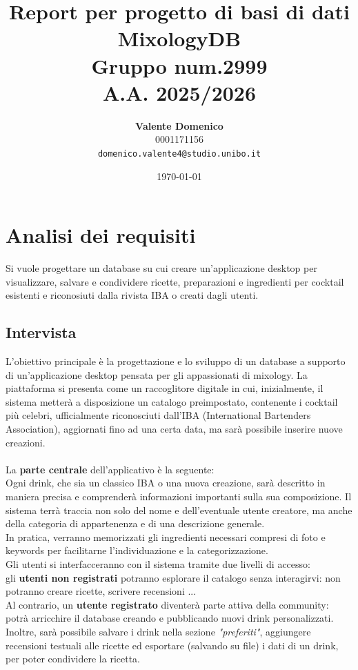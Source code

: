 \documentclass[a4paper,12pt]{report}
\title{Report per progetto di basi di dati\\ MixologyDB\\ \small Gruppo num.\normalsize 2999\\ \large A.A. 2025/2026\\}
\author{
    \textbf{\vspace{0.1cm}Valente Domenico} \\
     0001171156 \\
    \texttt{domenico.valente4@studio.unibo.it}
}
\date{\today}
\begin{document}
\maketitle

\tableofcontents
\newpage

\section{Analisi dei requisiti}
\begin{flushleft}
Si vuole progettare un database su cui creare un'applicazione desktop per visualizzare, salvare e condividere ricette, preparazioni e ingredienti per cocktail esistenti e riconosiuti dalla rivista IBA o creati dagli utenti.
\end{flushleft}

\subsection{Intervista}
L'obiettivo principale è la progettazione e lo sviluppo di un database a supporto di un'applicazione desktop pensata per gli appassionati di mixology. La piattaforma si presenta come un raccoglitore digitale in cui, inizialmente, il sistema metterà a disposizione un catalogo preimpostato, contenente i cocktail più celebri, ufficialmente riconosciuti dall'IBA (International Bartenders Association), aggiornati fino ad una certa data, ma sarà possibile inserire nuove creazioni.\\
\\
La \textbf{parte centrale} dell'applicativo è la seguente:\\
Ogni drink, che sia un classico IBA o una nuova creazione, sarà descritto in maniera precisa e comprenderà informazioni importanti sulla sua composizione. Il sistema terrà traccia non solo del nome e dell'eventuale utente creatore, ma anche della categoria di appartenenza e di una descrizione generale.\\
In pratica, verranno memorizzati gli ingredienti necessari compresi di foto e keywords per facilitarne l'individuazione e la categorizzazione.\\
Gli utenti si interfacceranno con il sistema tramite due livelli di accesso:\\
gli \textbf{utenti  non registrati} potranno esplorare il catalogo senza interagirvi: non potranno creare ricette, scrivere recensioni ...\\
Al contrario, un \textbf{utente registrato} diventerà parte attiva della community: potrà arricchire il database creando e pubblicando nuovi drink personalizzati. Inoltre, sarà possibile salvare i drink nella sezione \textit{"preferiti"}, aggiungere recensioni testuali alle ricette ed esportare (salvando su file) i dati di un drink, per poter condividere la ricetta.\\
\end{document}
